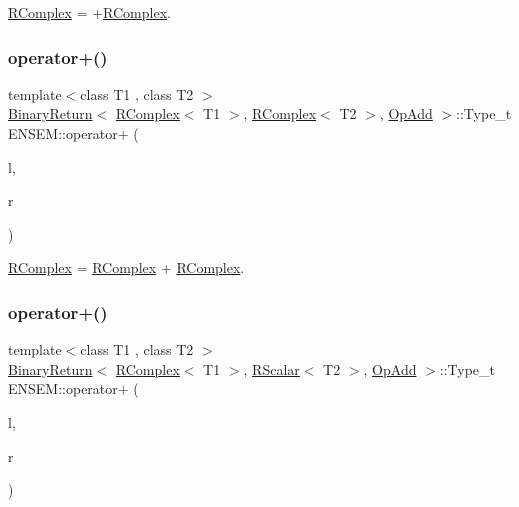 \mbox{\hyperlink{classENSEM_1_1RComplex}{R\+Complex}} = +\mbox{\hyperlink{classENSEM_1_1RComplex}{R\+Complex}}. 

\mbox{\label{group__rcomplex_ga4d7e8b93db619c9854c1e6fa23a3a454}} 
\subsubsection{\texorpdfstring{operator+()}{operator+()}\hspace{0.1cm}{\footnotesize\ttfamily [2/4]}}
{\footnotesize\ttfamily template$<$class T1 , class T2 $>$ \\
\mbox{\hyperlink{structENSEM_1_1BinaryReturn}{Binary\+Return}}$<$ \mbox{\hyperlink{classENSEM_1_1RComplex}{R\+Complex}}$<$ T1 $>$, \mbox{\hyperlink{classENSEM_1_1RComplex}{R\+Complex}}$<$ T2 $>$, \mbox{\hyperlink{structENSEM_1_1OpAdd}{Op\+Add}} $>$\+::Type\+\_\+t E\+N\+S\+E\+M\+::operator+ (\begin{DoxyParamCaption}\item[{const \mbox{\hyperlink{classENSEM_1_1RComplex}{R\+Complex}}$<$ T1 $>$ \&}]{l,  }\item[{const \mbox{\hyperlink{classENSEM_1_1RComplex}{R\+Complex}}$<$ T2 $>$ \&}]{r }\end{DoxyParamCaption})\hspace{0.3cm}{\ttfamily [inline]}}



\mbox{\hyperlink{classENSEM_1_1RComplex}{R\+Complex}} = \mbox{\hyperlink{classENSEM_1_1RComplex}{R\+Complex}} + \mbox{\hyperlink{classENSEM_1_1RComplex}{R\+Complex}}. 

\mbox{\label{group__rcomplex_gacf34d655d02ee81a131842116e13d950}} 
\subsubsection{\texorpdfstring{operator+()}{operator+()}\hspace{0.1cm}{\footnotesize\ttfamily [3/4]}}
{\footnotesize\ttfamily template$<$class T1 , class T2 $>$ \\
\mbox{\hyperlink{structENSEM_1_1BinaryReturn}{Binary\+Return}}$<$ \mbox{\hyperlink{classENSEM_1_1RComplex}{R\+Complex}}$<$ T1 $>$, \mbox{\hyperlink{classENSEM_1_1RScalar}{R\+Scalar}}$<$ T2 $>$, \mbox{\hyperlink{structENSEM_1_1OpAdd}{Op\+Add}} $>$\+::Type\+\_\+t E\+N\+S\+E\+M\+::operator+ (\begin{DoxyParamCaption}\item[{const \mbox{\hyperlink{classENSEM_1_1RComplex}{R\+Complex}}$<$ T1 $>$ \&}]{l,  }\item[{const \mbox{\hyperlink{classENSEM_1_1RScalar}{R\+Scalar}}$<$ T2 $>$ \&}]{r }\end{DoxyParamCaption})\hspace{0.3cm}{\ttfamily [inline]}}



